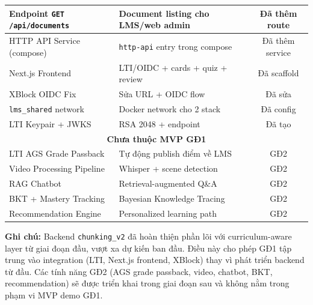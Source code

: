 \begin{table}[H]
\begin{tabular}{p{5.5cm}p{7cm}c}
        \midrule
        Endpoint \texttt{GET /api/documents}
            & Document listing cho LMS/web admin
            & \cellcolor{yellow!20}Đã thêm route \\
        \midrule
        HTTP API Service (compose)
            & \texttt{http-api} entry trong compose
            & \cellcolor{yellow!20}Đã thêm service \\
        \midrule
        Next.js Frontend
            & LTI/OIDC + cards + quiz + review
            & \cellcolor{yellow!20}Đã scaffold \\
        \midrule
        XBlock OIDC Fix
            & Sửa URL + OIDC flow
            & \cellcolor{yellow!20}Đã sửa \\
        \midrule
        \texttt{lms\_shared} network
            & Docker network cho 2 stack
            & \cellcolor{yellow!20}Đã config \\
        \midrule
        LTI Keypair + JWKS
            & RSA 2048 + endpoint
            & \cellcolor{yellow!20}Đã tạo \\
        \midrule
        \multicolumn{3}{c}{\textbf{Chưa thuộc MVP GĐ1}} \\
        \midrule
        LTI AGS Grade Passback
            & Tự động publish điểm về LMS
            & \cellcolor{red!20}GĐ2 \\
        \midrule
        Video Processing Pipeline
            & Whisper + scene detection
            & \cellcolor{red!20}GĐ2 \\
        \midrule
        RAG Chatbot
            & Retrieval-augmented Q\&A
            & \cellcolor{red!20}GĐ2 \\
        \midrule
        BKT + Mastery Tracking
            & Bayesian Knowledge Tracing
            & \cellcolor{red!20}GĐ2 \\
        \midrule
        Recommendation Engine
            & Personalized learning path
            & \cellcolor{red!20}GĐ2 \\
        \bottomrule
    \end{tabular}
\end{table}

\textbf{Ghi chú:} Backend \texttt{chunking\_v2} đã hoàn thiện phần lõi
với curriculum-aware layer từ giai đoạn đầu, vượt xa dự kiến ban đầu.
Điều này cho phép GĐ1 tập trung vào integration (LTI, Next.js frontend,
XBlock) thay vì phát triển backend từ đầu. Các tính năng GĐ2 (AGS
grade passback, video, chatbot, BKT, recommendation) sẽ được triển khai
trong giai đoạn sau và không nằm trong phạm vi MVP demo GĐ1.
